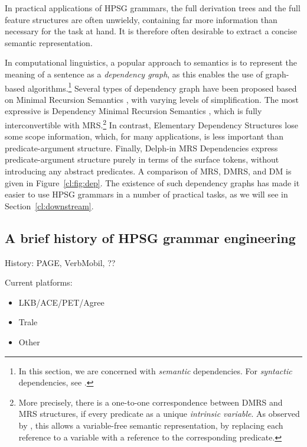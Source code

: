 \documentclass[output=paper]{langsci/langscibook}
\begin{document}
In practical applications of HPSG grammars,
the full derivation trees and the full feature structures are often unwieldy,
containing far more information than necessary for the task at hand.
It is therefore often desirable to extract a concise semantic representation.

In computational linguistics,
a popular approach to semantics is to represent the meaning of a sentence as a \textit{dependency graph},
as this enables the use of graph-based algorithms.\footnote{%
	In this section, we are concerned with \emph{semantic} dependencies.
	For \emph{syntactic} dependencies, see .
}
Several types of dependency graph have been proposed
based on Minimal Recursion Semantics \citep[MRS;][]{CFPS2005a},
with varying levels of simplification.
The most expressive is Dependency Minimal Recursion Semantics \citep[DMRS;][]{copestake2009dmrs},
which is fully interconvertible with MRS.\footnote{%
	More precisely, there is a one-to-one correspondence between DMRS and MRS structures,
	if every predicate as a unique \textit{intrinsic variable}.
	As observed by \citet{oepen2006eds}, this allows a variable-free semantic representation,
	by replacing each reference to a variable with a reference to the corresponding predicate.
}
In contrast, Elementary Dependency Structures \citep[EDS;][]{oepen2006eds}
lose some scope information,
which, for many applications, is less important than predicate-argument structure.
Finally, Delph-in MRS Dependencies \citep[DM;][]{ivanova2012dm}
express predicate-argument structure purely in terms of the surface tokens,
without introducing any abstract predicates.
A comparison of MRS, DMRS, and DM is given in Figure~\ref{cl:fig:dep}.
The existence of such dependency graphs
has made it easier to use HPSG grammars in a number of practical tasks,
as we will see in Section~\ref{cl:downstream}.



\subsection{A brief history of HPSG grammar engineering}
\label{cl:history}

History: PAGE, VerbMobil, ?? %


Current platforms:
    \begin{itemize}
    \item LKB/ACE/PET/Agree
    \item Trale
    \item Other
    \end{itemize}
\end{document}
